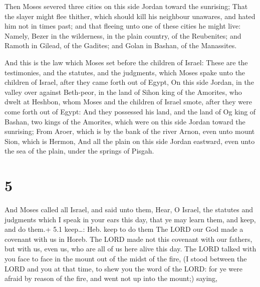  Then Moses severed three cities on this side Jordan
toward the sunrising;  That the slayer might flee thither,
which should kill his neighbour unawares, and hated him not in times
past; and that fleeing unto one of these cities he might live:
 Namely, Bezer in the wilderness, in the plain country, of
the Reubenites; and Ramoth in Gilead, of the Gadites; and Golan in
Bashan, of the Manassites.

 And this is the law which Moses set before the children
of Israel:  These are the testimonies, and the statutes,
and the judgments, which Moses spake unto the children of Israel, after
they came forth out of Egypt,  On this side Jordan, in the
valley over against Beth-peor, in the land of Sihon king of the
Amorites, who dwelt at Heshbon, whom Moses and the children of Israel
smote, after they were come forth out of Egypt:  And they
possessed his land, and the land of Og king of Bashan, two kings of the
Amorites, which were on this side Jordan toward the sunrising;
 From Aroer, which is by the bank of the river Arnon, even
unto mount Sion, which is Hermon,  And all the plain on
this side Jordan eastward, even unto the sea of the plain, under the
springs of Pisgah.

\hypertarget{section-4}{%
\section{5}\label{section-4}}

 And Moses called all Israel, and said unto them, Hear, O
Israel, the statutes and judgments which I speak in your ears this day,
that ye may learn them, and keep, and do them.+ 5.1 keep\ldots: Heb.
keep to do them  The LORD our God made a covenant with us in
Horeb.  The LORD made not this covenant with our fathers,
but with us, even us, who are all of us here alive this day.
 The LORD talked with you face to face in the mount out of
the midst of the fire,  (I stood between the LORD and you at
that time, to shew you the word of the LORD: for ye were afraid by
reason of the fire, and went not up into the mount;) saying,

